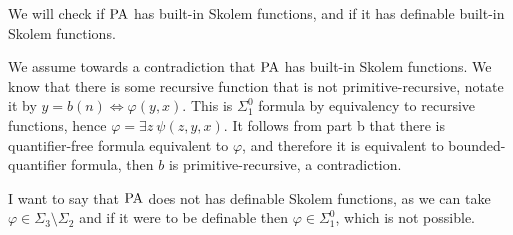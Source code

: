 \subquestion{}
We will check if $\operatorname{PA}$ has built-in Skolem functions, and if it has definable built-in Skolem functions.
\begin{solution}
	We assume towards a contradiction that $\operatorname{PA}$ has built-in Skolem functions.
	We know that there is some recursive function that is not primitive-recursive, notate it by $y = b(n) \iff \varphi(y, x)$.
	This is $\Sigma_1^0$ formula by equivalency to recursive functions, hence $\varphi = \exists z\ \psi(z, y, x)$.
	It follows from part b that there is quantifier-free formula equivalent to $\varphi$, and therefore it is equivalent to bounded-quantifier formula, then $b$ is primitive-recursive, a contradiction.

	I want to say that $\operatorname{PA}$ does not has definable Skolem functions, as we can take $\varphi \in \Sigma_3 \setminus \Sigma_2$ and if it were to be definable then $\varphi \in \Sigma_1^0$, which is not possible.
\end{solution}


